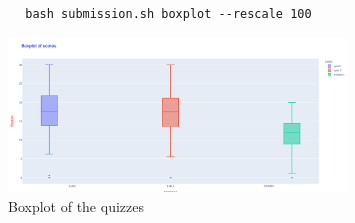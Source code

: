 \documentclass{article}
\begin{document}
    \begin{lstlisting}
        bash submission.sh boxplot --rescale 100
    \end{lstlisting}
    \begin{figure}[htbp]
        \centering
        \includegraphics[width=0.8\textwidth]{boxplot_of_scores.png}
        \caption{Boxplot of the quizzes}
        \label{fig:boxplot}
    \end{figure}
    \printbibliography
\end{document}

